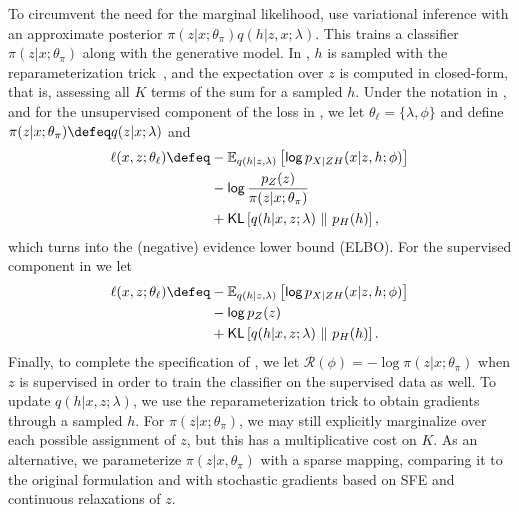 To circumvent the need for the marginal likelihood,
\citet{KingmaEtAl2014SSVAE} use variational inference
\citep{Jordan+1999:VI} with an approximate posterior $\pi(z|x;
    \theta_\pi)q(h|z,x; \lambda)$. This trains a classifier $\pi(z|x;
    \theta_\pi)$ along with the generative model. In
\citet{KingmaEtAl2014SSVAE}, $h$ is sampled with the
reparameterization trick~\citep{Kingma+2014:VAE,RezendeEtAl14VAE},
and the expectation over $z$ is computed in closed-form, that is,
assessing all $K$ terms of the sum for a sampled $h$. Under the
notation in , and for the unsupervised component of
the loss in , we let $\theta_\ell = \{\lambda,
    \phi\}$ and define $\pi(z|x; \theta_\pi) \defeq q(z|x; \lambda)$ and
%
\begin{align}
    \begin{split}
        \ell(x, z; \theta_\ell) \defeq
        & - \mathbb E_{q(h|z,  \lambda)}\left[ \log p_{X|ZH}(x |z, h; \phi) \right] \\
        & - \log \frac{p_Z(z)}{\pi(z |x; \theta_\pi)}                          \\
        & + \KL\left[q(h |x, z; \lambda) \,\,\|\,\, p_H(h)\right],
        \label{eq:elbonotation}
    \end{split}
\end{align}
%
which turns  into the (negative) evidence lower bound
(ELBO). For the supervised component in  we let
%
\begin{align}
    \begin{split}
        \ell(x, z; \theta_\ell) \defeq
        & - \mathbb E_{q(h|z,  \lambda)}\left[ \log p_{X|ZH}(x |z, h; \phi) \right] \\
        & - \log p_Z(z)                          \\
        & + \KL\left[q(h |x, z; \lambda) \,\,\|\,\, p_H(h)\right].
        \label{eq:elbosupervised}
    \end{split}
\end{align}
%
Finally, to complete the specification of ,
we let $\mathcal R(\phi) = - \log \pi(z |x; \theta_\pi)$ when $z$ is supervised
in order to train the classifier on the supervised data as well.
To update $q(h | x, z; \lambda)$, we use the
reparameterization trick to obtain gradients through a sampled $h$.
For $\pi(z | x; \theta_\pi)$, we may still explicitly marginalize over
each possible assignment of $z$, but this has a multiplicative cost
on $K$. As an alternative, we parameterize $\pi(z|x,
    \theta_\pi)$ with a sparse mapping, comparing it to the original
formulation and with stochastic gradients based on SFE and continuous
relaxations of $z$.

